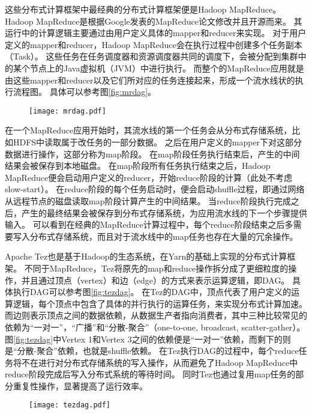 这些分布式计算框架中最经典的分布式计算框架便是Hadoop MapReduce\cite{hadoop}。
Hadoop MapReduce是根据Google发表的MapReduce\cite{mapreduce}论文修改并且开源而来。
其运行中的计算逻辑主要通过由用户定义具体的mapper和reducer来实现。
对于用户定义的mapper和reducer，Hadoop MapReduce会在执行过程中创建多个任务副本（Task）。
这些任务在任务调度器和资源调度器共同的调度下，会被分配到集群中的某个节点上的Java虚拟机（JVM）中进行执行。
而整个的MapReduce应用就是由这些mapper和reducer以及它们所对应的任务连接起来，形成一个流水线状的执行流程图。
具体可以参考图\ref{fig:mrdag}。

\begin{figure}[!htp]
    \centering
    \texttt{[image: mrdag.pdf]}
\end{figure}

在一个MapReduce应用开始时，其流水线的第一个任务会从分布式存储系统，比如HDFS中读取属于改任务的一部分数据。
之后在用户定义的mapper下对这部分数据进行操作，这部分称为map阶段。
在map阶段任务执行结束后，产生的中间结果会被保存到本地磁盘。
在map阶段所有任务执行结束之后，Hadoop MapReduce便会启动用户定义的reducer，开始reduce阶段的计算（此处不考虑slow-start）。
在reduce阶段的每个任务启动时，便会启动shuffle过程，即通过网络从远程节点的磁盘读取map阶段计算产生的中间结果。
当reduce阶段执行完成之后，产生的最终结果会被保存到分布式存储系统，为应用流水线的下一个步骤提供输入。
可以看到在经典的MapReduce计算过程中，每个reduce阶段结束之后多需要写入分布式存储系统，而且对于流水线中的map任务也存在大量的冗余操作。

Apache Tez\cite{tez}也是基于Hadoop的生态系统，在Yarn的基础上\cite{yarn}实现的分布式计算框架。
不同于MapReduce，Tez将原先的map和reduce操作拆分成了更细粒度的操作，并且通过顶点（vertex）和边（edge）的方式来表示运算逻辑，即DAG。
具体执行DAG可以参考图\ref{fig:tezdag}。
在Tez的DAG中，顶点代表了用户定义的运算逻辑，每个顶点中包含了具体的并行执行的运算任务，来实现分布式计算加速。
而边则表示顶点之间的数据依赖，从数据生产者指向消费者，其中三种比较常见的依赖为“一对一”，“广播”和“分散-聚合”（one-to-one, broadcast, scatter-gather）。
图\ref{fig:tezdag}中Vertex 1和Vertex 3之间的依赖便是“一对一”依赖，而剩下的则是“分散-聚合”依赖，也就是shuffle依赖。
在Tez执行DAG的过程中，每个reduce任务将不在进行对分布式存储系统的写入操作，从而避免了Hadoop MapReduce中reduce阶段完成后写入分布式系统的等待时间。
同时Tez也通过复用map任务的部分重复性操作，显著提高了运行效率。

\begin{figure}[!htp]
    \centering
    \texttt{[image: tezdag.pdf]}
\end{figure}

